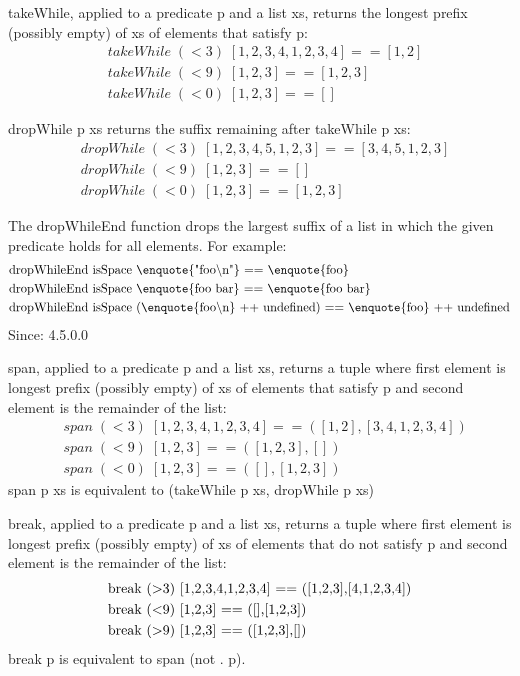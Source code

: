 takeWhile, applied to a predicate p and a list xs, returns the longest prefix (possibly empty) of xs of elements that satisfy p:
\begin{align*}
	&takeWhile\; (< 3)\; [1,2,3,4,1,2,3,4] == [1,2]\\
	&takeWhile\; (< 9)\; [1,2,3] == [1,2,3]\\
	&takeWhile\; (< 0)\; [1,2,3] == []
\end{align*}

dropWhile p xs returns the suffix remaining after takeWhile p xs:
\begin{align*}
	&dropWhile\; (< 3)\; [1,2,3,4,5,1,2,3] == [3,4,5,1,2,3]\\
	&dropWhile\; (< 9)\; [1,2,3] == []\\
	&dropWhile\; (< 0)\; [1,2,3] == [1,2,3]
\end{align*}

The dropWhileEnd function drops the largest suffix of a list in which the given predicate holds for all elements. For example:
\begin{align*}
	&\text{dropWhileEnd isSpace \enquote{"foo\textbackslash n"} == \enquote{foo}}\\
	&\text{dropWhileEnd isSpace \enquote{foo bar} == \enquote{foo bar}}\\
	&\text{dropWhileEnd isSpace (\enquote{foo\textbackslash n} ++ undefined) == \enquote{foo} ++ undefined}
\end{align*}
Since: 4.5.0.0

span, applied to a predicate p and a list xs, returns a tuple where first element is longest prefix (possibly empty) of xs of elements that satisfy p and second element is the remainder of the list:
\begin{align*}
	&span\; (< 3)\; [1,2,3,4,1,2,3,4] == ([1,2],[3,4,1,2,3,4])\\
	&span\; (< 9)\; [1,2,3] == ([1,2,3],[])\\
	&span\; (< 0)\; [1,2,3] == ([],[1,2,3])
\end{align*}
span p xs is equivalent to (takeWhile p xs, dropWhile p xs)

break, applied to a predicate p and a list xs, returns a tuple where first element is longest prefix (possibly empty) of xs of elements that do not satisfy p and second element is the remainder of the list:
\begin{align*}
	&\text{break (\textgreater 3) [1,2,3,4,1,2,3,4] == ([1,2,3],[4,1,2,3,4])}\\
	&\text{break (\textless 9) [1,2,3] == ([],[1,2,3])}\\
	&\text{break (\textgreater 9) [1,2,3] == ([1,2,3],[])}
\end{align*}
break p is equivalent to span (not . p).

